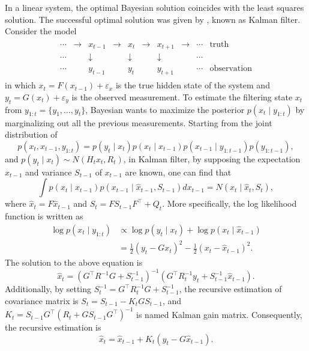 In a linear system, the optimal Bayesian solution coincides with the least squares solution. The successful optimal solution was given by \cite{kalman1960new},  known as Kalman filter. Consider the model 
\begin{align*}
\begin{array}{cccccccccc}\cdots &\to &x_{t-1}&\to &x_{t}&\to &x_{t+1}&\to &\cdots &{\text{truth}}\\ \cdots &&\downarrow &&\downarrow &&\downarrow &&\cdots &\\ \cdots&&y_{t-1}&&y_{t}&&y_{t+1}&&\cdots &{\text{observation}}\end{array}
\end{align*}
in which $x_t=F(x_{t-1})+\varepsilon_x$ is the true hidden state of the system and $y_t=G(x_t)+\varepsilon_y$ is the observed measurement. To estimate the filtering state $x_t$ from $y_{1:t}=\{y_1,\ldots,y_t\}$, Bayesian wants to maximize the posterior $p(x_t\mid y_{1:t})$ by marginalizing out all the previous measurements. Starting from the joint distribution of 
\begin{equation*}
p(x_t,x_{t-1},y_{1:t}) = p(y_t\mid x_t)p(x_t\mid x_{t-1})p(x_{t-1}\mid y_{1:t-1})p(y_{1:t-1}),
\end{equation*}
and $p(y_t\mid x_t)\sim N(H_tx_t,R_t)$, in Kalman filter, by supposing the expectation $\hat{x}_{t-1}$ and variance $S_{t-1}$ of $x_{t-1}$ are known, one can find that 
\begin{equation*}
\int p(x_t\mid x_{t-1})p(x_{t-1}\mid \hat{x}_{t-1},S_{t-1})dx_{t-1} = N(x_t\mid \hat{x}_t,S_t), 
\end{equation*}
where $\hat{x}_t=F\hat{x}_{t-1}$ and $S_t=FS_{t-1}F^\top + Q_t$. More specifically, the log likelihood function is written as
\begin{align*}
\log p(x_t\mid y_{1:t}) &\propto \log p(y_t\mid x_t) + \log p(x_t\mid \hat{x}_{t-1}) \\%
                          &=\frac{1}{2}(y_t-Gx_t)^2-\frac{1}{2}(x_t-\hat{x}_{t-1})^2.  %
\end{align*} 
The solution to the above equation is
\begin{equation*}
\hat{x}_t = \left(G^\top R^{-1}G+S_{t-1}^{-1}\right)^{-1}\left( G^\top R_t^{-1}y_t+S_{t-1}^{-1}\hat{x}_{t-1} \right).
\end{equation*}
Additionally, by setting $S_t^{-1} = G^\top R_t^{-1}G+S_{t-1}^{-1}$, the recursive estimation of covariance matrix is $S_t = S_{t-1} - K_t GS_{t-1}$, 
and $K_t = S_{t-1} G^\top (R_t +GS_{t-1}G^\top)^{-1}$ is named Kalman gain matrix. Consequently, the recursive estimation is 
\begin{equation}\label{KalmanEstimation}
\hat{x}_t = \hat{x}_{t-1}+K_t(y_t-G\hat{x}_{t-1}).
\end{equation}

